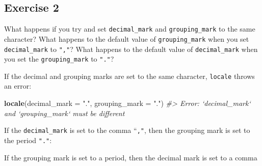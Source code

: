 \documentclass[]{book}
\newenvironment{Shaded}{\begin{snugshade}}{\end{snugshade}}
\newcommand{\CommentTok}[1]{\textcolor[rgb]{0.56,0.35,0.01}{\textit{#1}}}
\newcommand{\DataTypeTok}[1]{\textcolor[rgb]{0.13,0.29,0.53}{#1}}
\newcommand{\KeywordTok}[1]{\textcolor[rgb]{0.13,0.29,0.53}{\textbf{#1}}}
\newcommand{\NormalTok}[1]{#1}
\newcommand{\StringTok}[1]{\textcolor[rgb]{0.31,0.60,0.02}{#1}}
\theoremstyle{definition}
\theoremstyle{definition}
\theoremstyle{definition}
\theoremstyle{remark}
\begin{document}
\hypertarget{exercise-2-14}{%
\subsection{Exercise 2}\label{exercise-2-14}}

What happens if you try and set \texttt{decimal\_mark} and
\texttt{grouping\_mark} to the same character? What happens to the
default value of \texttt{grouping\_mark} when you set
\texttt{decimal\_mark} to \texttt{","}? What happens to the default
value of \texttt{decimal\_mark} when you set the \texttt{grouping\_mark}
to \texttt{"."}?

If the decimal and grouping marks are set to the same character,
\texttt{locale} throws an error:

\begin{Shaded}
\begin{Highlighting}[]
\KeywordTok{locale}\NormalTok{(}\DataTypeTok{decimal_mark =} \StringTok{"."}\NormalTok{, }\DataTypeTok{grouping_mark =} \StringTok{"."}\NormalTok{)}
\CommentTok{#> Error: `decimal_mark` and `grouping_mark` must be different}
\end{Highlighting}
\end{Shaded}

If the \texttt{decimal\_mark} is set to the comma ``\texttt{,"}, then
the grouping mark is set to the period \texttt{"."}:

\begin{Shaded}
\end{Shaded}

If the grouping mark is set to a period, then the decimal mark is set to
a comma
\end{document}
